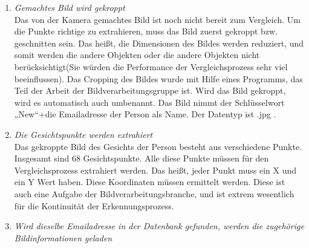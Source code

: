 \begin{enumerate}
Gleich nachdem der Benutzer sein Email eingegeben hat, macht die Kamera das Bild. Dieses Bild wird tempor{\"a}r gespeichert, weil es nach dem Vergleich mit dem Bild, das schon in der Datenbank liegt, nicht mehr benötigt wird. Sonst w{\"u}rde es extrem viele Bilderdaten in der Datenbank geben, die nur einmal verwendet werden. Stattdessen wird nur der Pfad des Bildes zusammen mit den extrahierten Punkten in der Datenbank gespeichert.
	\item \textit{Gemachtes Bild wird gekroppt} \\
	
Das von der Kamera gemachtes Bild ist noch nicht bereit zum Vergleich. Um die Punkte richtige zu extrahieren, muss das Bild zuerst gekroppt bzw. geschnitten sein. Das heißt, die Dimensionen des Bildes werden reduziert, und somit werden die andere Objekten oder die andere Objekten nicht berücksichtigt(Sie würden die Performance der Vergleichsprozess sehr viel beeinflussen). Das Cropping des Bildes wurde mit Hilfe eines Programms, das Teil der Arbeit der Bildverarbeitungsgruppe ist. Wird das Bild gekroppt, wird es automatisch auch umbenannt. Das Bild nimmt der Schlüsselwort „New“+die Emailadresse der Person als Name. Der Datentyp ist .jpg .
	\item \textit{Die Gesichtspunkte werden extrahiert} \\
	
Das gekroppte Bild des Gesichts der Person besteht aus verschiedene Punkte. Insgesamt sind 68 Gesichtspunkte. Alle diese Punkte müssen für den Vergleichsprozess extrahiert werden. Das heißt, jeder Punkt muss ein X und ein Y Wert haben. Diese Koordinaten müssen ermittelt werden. Diese ist auch eine Aufgabe der Bildverarbeitungsbranche, und ist extrem wesentlich für die Kontinuität der Erkennungsprozess.
	\item \textit{Wird dieselbe Emailadresse in der Datenbank gefunden, werden die zugehörige Bildinformationen geladen} \\
	

\end{enumerate}

